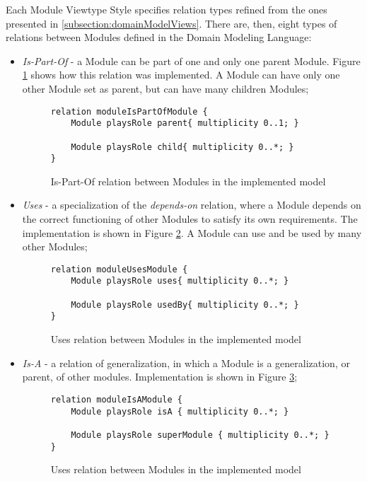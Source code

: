 Each Module Viewtype Style specifies relation types refined from the ones presented in \ref{subsection:domainModelViews}. There are, then, eight types of relations between Modules\cite{clements2003documenting} defined in the Domain Modeling Language:
\begin{itemize}
\item \textit{Is-Part-Of} - a Module can be part of one and only one parent Module. Figure \ref{figure:modelIsPartOfRelation} shows how this relation was implemented. A Module can have only one other Module set as parent, but can have many children Modules;
\begin{figure}[h]
\centering
\lstset{style=customjava}
\begin{lstlisting}
relation moduleIsPartOfModule {
	Module playsRole parent{ multiplicity 0..1; }
	
	Module playsRole child{ multiplicity 0..*; }
}
\end{lstlisting}
\caption{Is-Part-Of relation between Modules in the implemented model}
\label{figure:modelIsPartOfRelation}
\end{figure}

\item \textit{Uses} - a specialization of the \textit{depends-on} relation, where a Module depends on the correct functioning of other Modules to satisfy its own requirements. The implementation is shown in Figure \ref{figure:modelUsesRelation}. A Module can use and be used by many other Modules;
\begin{figure}[h]
\lstset{style=customjava}
\begin{lstlisting}
relation moduleUsesModule {
	Module playsRole uses{ multiplicity 0..*; }
	
	Module playsRole usedBy{ multiplicity 0..*; }
}
\end{lstlisting}
\caption{Uses relation between Modules in the implemented model}
\label{figure:modelUsesRelation}
\end{figure}

\item \textit{Is-A} - a relation of generalization, in which a Module is a generalization, or parent, of other modules. Implementation is shown in Figure \ref{figure:modelIsARelation}; 
\begin{figure}[h]
\lstset{style=customjava}
\begin{lstlisting}
relation moduleIsAModule {
	Module playsRole isA { multiplicity 0..*; }
	
	Module playsRole superModule { multiplicity 0..*; }
}
\end{lstlisting}
\caption{Uses relation between Modules in the implemented model}
\label{figure:modelIsARelation}
\end{figure}


\end{itemize}
